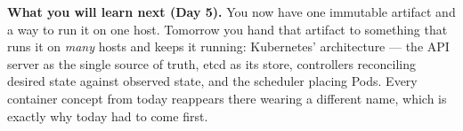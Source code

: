 \begin{keyidea}
\textbf{What you will learn next (Day 5).} You now have one immutable artifact and a way to run it on one host. Tomorrow you hand that artifact to something that runs it on \emph{many} hosts and keeps it running: Kubernetes' architecture --- the API server as the single source of truth, etcd as its store, controllers reconciling desired state against observed state, and the scheduler placing Pods. Every container concept from today reappears there wearing a different name, which is exactly why today had to come first.
\end{keyidea}
